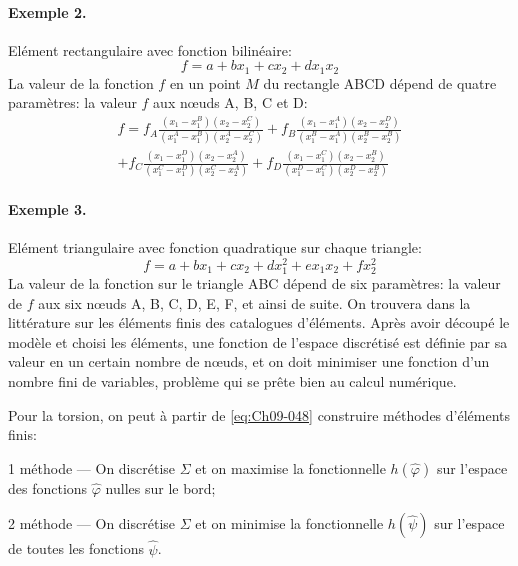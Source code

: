 \paragraph{Exemple 2.} 
Elément rectangulaire avec fonction bilinéaire: 
\[
f = a +b x_1+cx_2 +dx_1x_2
\]
La valeur de la fonction $f$ en un point $M$ du rectangle ABCD dépend de quatre paramètres: la valeur $f$ aux nœuds A, B, C et D:
\begin{multline}
    f = f_A \frac{(x_1 - x_1^B)(x_2 -x_2^C)}{(x_1^A - x_1^B)(x_2^A-x_2^C)} +  f_B \frac{(x_1 - x_1^A)(x_2 -x_2^D)}{(x_1^B - x_1^A)(x_2^B-x_2^B)} \\
    + f_C \frac{(x_1 - x_1^D)(x_2 -x_2^A)}{(x_1^C - x_1^D)(x_2^C-x_2^A)} + f_D \frac{(x_1 - x_1^C)(x_2 -x_2^B)}{(x_1^D - x_1^C)(x_2^D-x_2^B)}
    \label{eq:Ch09-065} 
\end{multline}

\paragraph{Exemple 3.}
Elément triangulaire avec fonction quadratique sur chaque triangle: 
\begin{equation}
    f = a + b x_1 + c x_2 + d x_1^2 + e x_1 x_2 +f x_2^2
    \label{eq:Ch09-066}
\end{equation}
La valeur de la fonction sur le triangle ABC dépend de six paramètres: la valeur de $f$ aux six nœuds A, B, C, D, E, F, et ainsi de suite.
On trouvera dans la littérature sur les éléments finis des catalogues d'éléments. 
Après avoir découpé le modèle et choisi les éléments, une fonction de l'espace discrétisé est définie par sa valeur en un certain nombre de nœuds, et on doit minimiser une fonction d'un nombre fini de variables, problème qui se prête bien au calcul numérique. 

Pour la torsion, on peut à partir de \eqref{eq:Ch09-048} construire méthodes d'éléments finis:
\begin{description}
    \item 1 méthode --- On discrétise $\Sigma$ et on maximise la fonctionnelle $h(\hat{\varphi})$ sur l'espace des fonctions $\hat{\varphi}$ nulles sur le bord; 
    \item 2 méthode --- On discrétise $\Sigma$ et on minimise la fonctionnelle $h(\hat{\psi})$ sur l'espace de toutes les fonctions $\hat{\psi}$.
\end{description}

